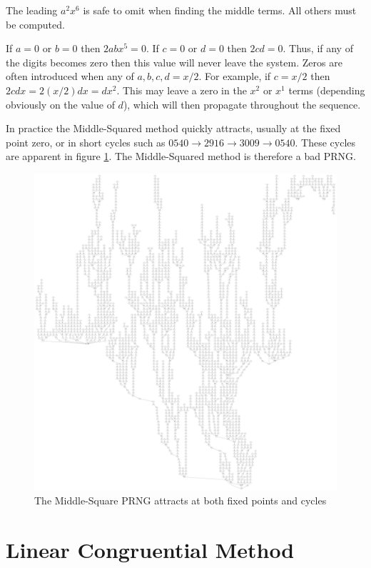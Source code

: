 \documentclass{book}
\begin{document}
The leading $a^2x^6$ is safe to omit when finding the middle terms. All others must be computed.

If $a=0$ or $b=0$ then $2abx^5=0$. If $c=0$ or $d=0$ then $2cd=0$. Thus, if any of the digits becomes zero then this value will never leave the system. Zeros are often introduced when any of $a,b,c,d=x/2$. For example, if $c=x/2$ then $2cdx=2(x/2)dx=dx^2$. This may leave a zero in the $x^2$ or $x^1$ terms (depending obviously on the value of $d$), which will then propagate throughout the sequence.

In practice the Middle-Squared method quickly attracts, usually at the fixed point zero, or in short cycles such as $0540 \to 2916 \to 3009 \to 0540$. These cycles are apparent in figure \ref{middlesquare}. The Middle-Squared method is therefore a bad PRNG.

\begin{figure}[H]
\centering
\includegraphics[width=\textwidth,height=.95\textheight,keepaspectratio]{figures/middlesquare}
\caption{The Middle-Square PRNG attracts at both fixed points and cycles}
\label{middlesquare}
\end{figure}

\section{Linear Congruential Method}
\end{document}
